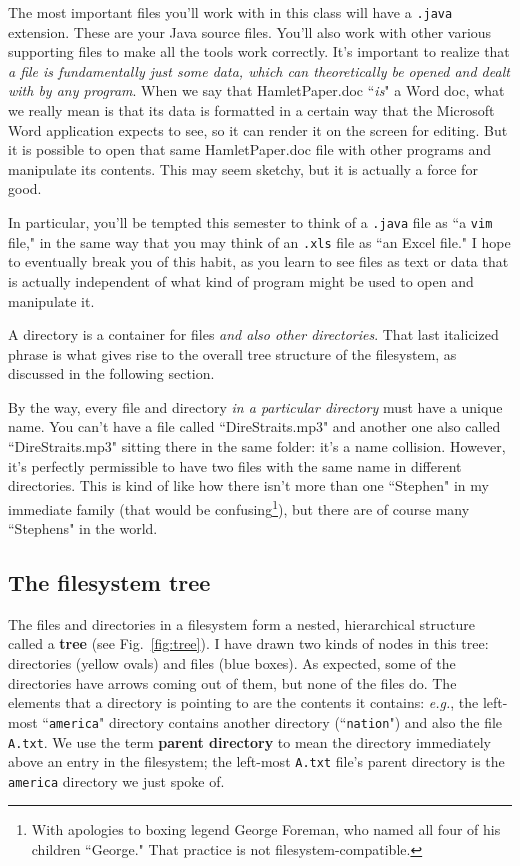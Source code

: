 The most important files you'll work with in this class will have a
\texttt{.java} extension. These are your Java source files. You'll also work
with other various supporting files to make all the tools work correctly.
It's important to realize that \textit{a file is fundamentally just some data,
which can theoretically be opened and dealt with by any program}. When we say
that HamletPaper.doc ``\textit{is}" a Word doc, what we really mean is that
its data is formatted in a certain way that the Microsoft Word application
expects to see, so it can render it on the screen for editing. But it is
possible to open that same HamletPaper.doc file with other programs and
manipulate its contents. This may seem sketchy, but it is actually a force for
good.

In particular, you'll be tempted this semester to think of a \texttt{.java}
file as ``a \texttt{vim} file," in the same way that you may think of an
\texttt{.xls} file as ``an Excel file." I hope to eventually break you of this
habit, as you learn to see files as text or data that is actually independent
of what kind of program might be used to open and manipulate it.

A directory is a container for files \textit{and also other directories}. That
last italicized phrase is what gives rise to the overall tree structure of the
filesystem, as discussed in the following section.

By the way, every file and directory \textit{in a particular directory} must
have a unique name. You can't have a file called ``DireStraits.mp3" and
another one also called ``DireStraits.mp3" sitting there in the same folder:
it's a name collision. However, it's perfectly permissible to have two files
with the same name in different directories. This is kind of like how there
isn't more than one ``Stephen" in my immediate family (that would be
confusing\footnote{With apologies to boxing legend George Foreman, who named
all four of his children ``George." That practice is not
filesystem-compatible.}), but there are of course many ``Stephens" in the
world.

\subsection{The filesystem tree}

The files and directories in a filesystem form a nested, hierarchical
structure called a \textbf{tree} (see Fig.~\ref{fig:tree}). I have drawn two
kinds of nodes in this tree: directories (yellow ovals) and files (blue
boxes). As expected, some of the directories have arrows coming out of them,
but none of the files do. The elements that a directory is pointing to are the
contents it contains: \textit{e.g.}, the left-most ``\texttt{america}"
directory contains another directory (``\texttt{nation}") and also the file
\texttt{A.txt}. We use the term \textbf{parent directory} to mean the
directory immediately above an entry in the filesystem; the left-most
\texttt{A.txt} file's parent directory is the \texttt{america} directory we
just spoke of.

